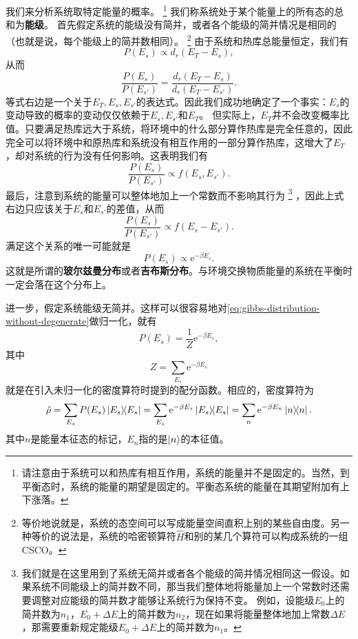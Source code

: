 \documentclass[hyperref, UTF8, a4paper]{ctexart}
\newcommand*{\ee}{\mathrm{e}}
\begin{document}
我们来分析系统取特定能量的概率。%
\footnote{请注意由于系统可以和热库有相互作用，系统的能量并不是固定的。当然，到平衡态时，系统的能量的期望是固定的。平衡态系统的能量在其期望附加有上下涨落。}
我们称系统处于某个能量上的所有态的总和为\textbf{能级}。
首先假定系统的能级没有简并，或者各个能级的简并情况是相同的（也就是说，每个能级上的简并数相同）。%
\footnote{等价地说就是，系统的态空间可以写成能量空间直积上别的某些自由度。另一种等价的说法是，系统的哈密顿算符$\hat{H}$和别的某几个算符可以构成系统的一组CSCO。}%
由于系统和热库总能量恒定，我们有
\[
    P(E_s) \propto d_r (E_T - E_s),
\]
从而
\[
    \frac{P(E_s)}{P(E_{s'})} = \frac{d_r (E_T - E_s)}{d_r (E_T - E_{s'})}.
\]
等式右边是一个关于$E_T, E_s, E_{s'}$的表达式。因此我们成功地确定了一个事实：$E_s$的变动导致的概率的变动仅仅依赖于$E_s, E_{s'}$和$E_T$。
但实际上，$E_T$并不会改变概率比值。只要满足热库远大于系统，将环境中的什么部分算作热库是完全任意的，因此完全可以将环境中和原热库和系统没有相互作用的一部分算作热库，这增大了$E_T$，却对系统的行为没有任何影响。这表明我们有
\[
    \frac{P(E_s)}{P(E_{s'})} \propto f(E_s, E_{s'}).
\]
最后，注意到系统的能量可以整体地加上一个常数而不影响其行为%
\footnote{我们就是在这里用到了系统无简并或者各个能级的简并情况相同这一假设。如果系统不同能级上的简并数不同，那当我们整体地将能量加上一个常数时还需要调整对应能级的简并数才能够让系统行为保持不变。
例如，设能级$E_0$上的简并数为$n_1$，$E_0 + \Delta E$上的简并数为$n_2$，现在如果将能量整体地加上常数$\Delta E$，那需要重新规定能级$E_0 + \Delta E$上的简并数为$n_1$。}%
，因此上式右边只应该关于$E_s$和$E_{s'}$的差值，从而
\[
    \frac{P(E_s)}{P(E_{s'})} \propto f(E_s - E_{s'}).
\]
满足这个关系的唯一可能就是
\begin{equation}
    P(E_s) \propto \ee^{- \beta E_s}.
    \label{eq:gibbs-distribution-without-degenerate}
\end{equation}
这就是所谓的\textbf{玻尔兹曼分布}或者\textbf{吉布斯分布}。与环境交换物质能量的系统在平衡时一定会落在这个分布上。

进一步，假定系统能级无简并。这样可以很容易地对\eqref{eq:gibbs-distribution-without-degenerate}做归一化，就有
\begin{equation}
    P(E_s) = \frac{1}{Z} \ee^{ - \beta E_s},
    \label{eq:distribution-of-energy-without-degenerate}
\end{equation}
其中
\begin{equation}
    Z = \sum_{E_s} \ee^{ - \beta E_s}
    \label{eq:partition-function-without-degenerate}
\end{equation}
就是在引入未归一化的密度算符时提到的配分函数。相应的，密度算符为
\begin{equation}
    \hat{\rho} = \sum_{E_s} P(E_s) \dyad{E_s} = \sum_{E_s} \ee^{-\beta E_s} \dyad{E_s} = \sum_n \ee^{-\beta E_n} \dyad{n}.
    \label{eq:density-operator-without-degenerate}
\end{equation}
其中$n$是能量本征态的标记，$E_n$指的是$\ket{n}$的本征值。
\end{document}
